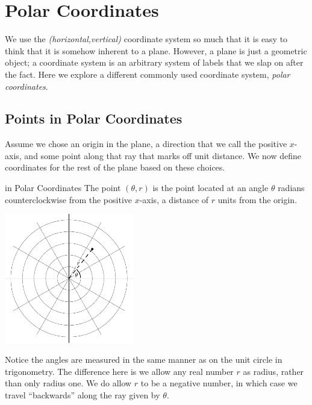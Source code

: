 \section{Polar Coordinates}\label{Polar}
We use the \emph{(horizontal,vertical)} coordinate system so much that it is easy to think that it is somehow inherent to a plane.  However, a plane is just a geometric object; a coordinate system is an arbitrary system of labels that we slap on after the fact. Here we explore a different commonly used coordinate system, \emph{polar coordinates}.

\subsection{Points in Polar Coordinates}
Assume we chose an origin in the plane, a direction that we call the positive $x$-axis, and some point along that ray that marks off unit distance.  We now define coordinates for the rest of the plane based on these choices.  

\begin{definition}{ in Polar Coordinates} The point $(\theta, r)$ is the point located at an angle $\theta$ radians counterclockwise from the positive $x$-axis, a distance of $r$ units from the origin.  

	\begin{center}
		\includegraphics[width=160pt]{ChapterCalcIII/Figures/polargraph.eps}
	\end{center}

\end{definition}

Notice the angles are measured in the same manner as on the unit circle in trigonometry.  The difference here is we allow any real number $r$ as radius, rather than only radius one.  We do allow $r$ to be a negative number, in which case we travel ``backwards'' along the ray given by $\theta$.

